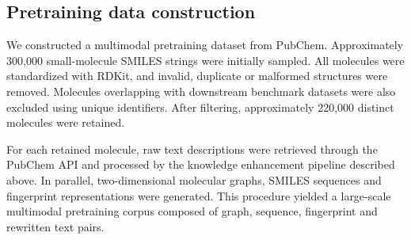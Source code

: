 \documentclass[webpdf,contemporary,large]{oup-authoring-template}%
\begin{document}
\subsection{Pretraining data construction}
We constructed a multimodal pretraining dataset from PubChem. Approximately 300,000 small-molecule SMILES strings were initially sampled. All molecules were standardized with RDKit, and invalid, duplicate or malformed structures were removed. Molecules overlapping with downstream benchmark datasets were also excluded using unique identifiers. After filtering, approximately 220,000 distinct molecules were retained.

For each retained molecule, raw text descriptions were retrieved through the PubChem API and processed by the knowledge enhancement pipeline described above. In parallel, two-dimensional molecular graphs, SMILES sequences and fingerprint representations were generated. This procedure yielded a large-scale multimodal pretraining corpus composed of graph, sequence, fingerprint and rewritten text pairs.
\end{document}
